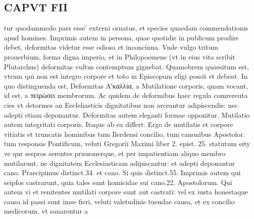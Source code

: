 \documentclass{article}
\begin{document}
\begin{pages}
\section*{CAPVT  FII }
\marginpar{[ p.123 ]}\pstart tur quodammodo pars esse' externi ornatus, et species quaedam commendationis apud homines. Imprimis autem in persona, quae quotidie in publicum prodire debet, deformitas videtur esse odiosa et inconcinna. Vnde vulgo tritum prouerbium, forma digna imperio, et in Philopoemene (vt in eius vita scribit Plutarchus) deformitas vultus contemptum gignebat. Quamobrem quaesitum est, vtrum qui non est integro corpore et toto in Episcopum eligi possit et debeat. In quo distinguenda est, Deformitas Αʹκαλλία, a Mutilatione corporis, quam vocant, id est, a πειρώσει membrorum. Ac quidem de deformibus haec regula comrereuta cies vt detormes an Eecleliasticis dignitatibus non arceantur adipiscendis: nec adepti etiam deponantur. Deformitas autem eleganti formae opponitur. Mutilatio autem integritati corporis. Itaque ab ea differt.  \pend\pstart Ergo de mutilatis et corpore vitiatis et truncatis hominibus tum Ilerdensi concilio, tum canonibus Apostolor. tum responsis Pontificum, veluti Gregorii Maximi liber 2. epist. 25. statutum eity ve qur sespros serentes pruuemerque, et per impatientiam aliquo membro mutilarunt, ne dignitatem Ecclesiasticam adipiscantur: et adepti deponantur cano. Praecipimus distinct.34. et cano. Si quis distinct.55. Imprimis autem qui seipfos castrarunt, quia tales sunt homicidae sui cano.22. Apostolorum.  \pend\pstart Qui autem vi et renitentes mutilati corpore sunt aut castrati: vel ex iusta honestaque causa id passi sunt imse fieri, veluti valetudinis tuendae causa, et ex concilio medicorum, vt sanarentur a  \pend

\end{pages}
\end{document}
